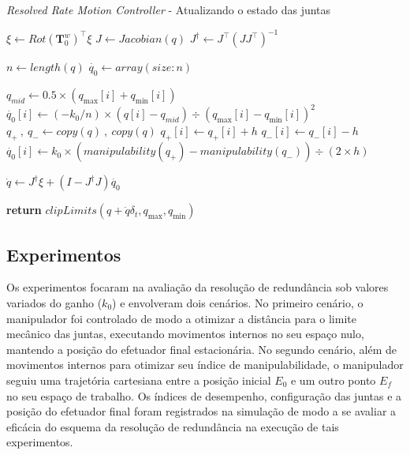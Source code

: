 \begin{algorithm}
    \caption{\emph{Resolved Rate Motion Controller} {-} Atualizando o estado das juntas}\label{rrc-alg}
    \begin{algorithmic}[1]
        \State$\xi \gets {Rot(\mathbf{T}^w_0)}^\top \xi$
        \State$J \gets Jacobian(q)$
        \State$J^\dag \gets J^\top {(J J^\top)}^{-1}$

        \State$n \gets length(q)$
        \State$\dot{q_0} \gets array(size: n)$

         
        \State$q_{mid} \gets 0.5 \times (q_{\max}[i] + q_{\min}[i])$
        \State$\dot{q_0}[i] \gets (-k_0 / n) \times (q[i] - q_{mid}) \div {{(q_{\max}[i] - q_{\min}[i])}^2}$
        \State$q_{+} \ , \ q_{-} \gets copy(q) \ , \ copy(q)$
        \State$q_{+}[i] \gets q_{+}[i] + h$
        \State$q_{-}[i] \gets q_{-}[i] - h$
        \State$\dot{q_0}[i] \gets k_0 \times (manipulability(q_{+}) - manipulability(q_{-})) \div (2 \times h)$
        \EndIf{}
        \EndFor{}

        \State$\dot{q} \gets J^\dag \xi + (I - J^\dag J) \dot{q_0}$

        \State\textbf{return} $clipLimits(q + \dot{q} \delta_t, q_{\max}, q_{\min})$ 
        \EndProcedure\end{algorithmic}
\end{algorithm}

\subsection*{Experimentos}

Os experimentos focaram na avaliação da resolução de redundância
sob valores variados do ganho (\(k_0\)) e envolveram dois cenários. No primeiro
cenário, o manipulador foi controlado de modo a otimizar a distância para o limite mecânico das juntas, 
executando movimentos internos no seu espaço nulo, mantendo a posição do efetuador final estacionária.
No segundo cenário, além de movimentos internos para otimizar seu índice de manipulabilidade, o manipulador 
seguiu uma trajetória cartesiana entre a posição inicial \(E_0\) e um outro ponto \(E_f\) no seu espaço 
de trabalho. Os índices de desempenho, configuração das juntas e a 
posição do efetuador final foram registrados na simulação de modo a se avaliar 
a eficácia do esquema da resolução de redundância na execução de tais experimentos.

